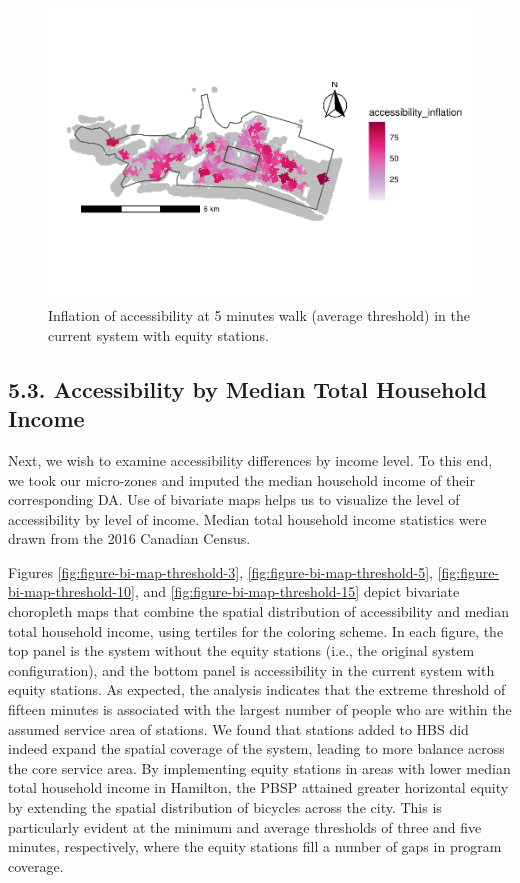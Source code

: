 \documentclass[]{elsarticle} %
\begin{document}
\begin{figure}

{\centering \includegraphics[width=0.9\linewidth]{Bike-share-spatial-equity_files/figure-latex/figure-11-1} 

}

\caption{Inflation of accessibility at 5 minutes walk (average threshold) in the current system with equity stations.}\label{fig:figure-11}
\end{figure}

\hypertarget{accessibility-by-median-total-household-income}{%
\subsection{5.3. Accessibility by Median Total Household
Income}\label{accessibility-by-median-total-household-income}}

Next, we wish to examine accessibility differences by income level. To
this end, we took our micro-zones and imputed the median household
income of their corresponding DA. Use of bivariate maps helps us to
visualize the level of accessibility by level of income. Median total
household income statistics were drawn from the 2016 Canadian Census.

Figures \ref{fig:figure-bi-map-threshold-3},
\ref{fig:figure-bi-map-threshold-5},
\ref{fig:figure-bi-map-threshold-10}, and
\ref{fig:figure-bi-map-threshold-15} depict bivariate choropleth maps
that combine the spatial distribution of accessibility and median total
household income, using tertiles for the coloring scheme. In each
figure, the top panel is the system without the equity stations (i.e.,
the original system configuration), and the bottom panel is
accessibility in the current system with equity stations. As expected,
the analysis indicates that the extreme threshold of fifteen minutes is
associated with the largest number of people who are within the assumed
service area of stations. We found that stations added to HBS did indeed
expand the spatial coverage of the system, leading to more balance
across the core service area. By implementing equity stations in areas
with lower median total household income in Hamilton, the PBSP attained
greater horizontal equity by extending the spatial distribution of
bicycles across the city. This is particularly evident at the minimum
and average thresholds of three and five minutes, respectively, where
the equity stations fill a number of gaps in program coverage.
\end{document}
